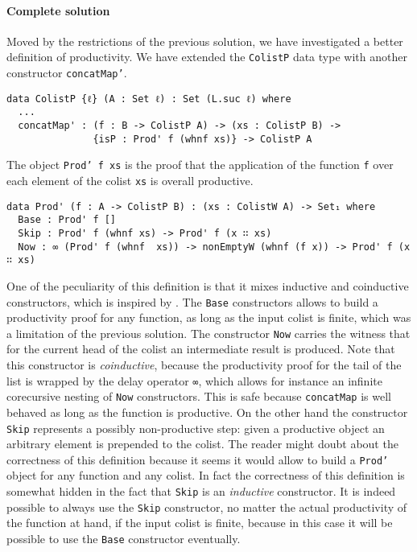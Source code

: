 \documentclass[10pt,a4paper]{article}
\begin{document}
\paragraph{Complete solution}
Moved by the restrictions of the previous solution, we have investigated a better definition of productivity.
We have extended the \texttt{ColistP} data type with another constructor \texttt{concatMap'}.
\begin{verbatim}
data ColistP {ℓ} (A : Set ℓ) : Set (L.suc ℓ) where
  ...
  concatMap' : (f : B -> ColistP A) -> (xs : ColistP B) -> 
               {isP : Prod' f (whnf xs)} -> ColistP A
\end{verbatim}
The object \texttt{Prod' f xs} is the proof that the application of the function \texttt{f} over each element of the colist \texttt{xs} is overall productive.
\begin{verbatim}
data Prod' (f : A -> ColistP B) : (xs : ColistW A) -> Set₁ where
  Base : Prod' f []
  Skip : Prod' f (whnf xs) -> Prod' f (x ∷ xs)
  Now : ∞ (Prod' f (whnf  xs)) -> nonEmptyW (whnf (f x)) -> Prod' f (x ∷ xs)
\end{verbatim}
One of the peculiarity of this definition is that it mixes inductive and coinductive constructors, which is inspired by \cite{DAN09}.
The \texttt{Base} constructors allows to build a productivity proof for any
function, as long as the input colist is finite, which was a limitation of the previous solution.
The constructor \texttt{Now} carries the witness that for the current head of the colist an intermediate result is produced. Note that this constructor is \emph{coinductive}, because the productivity proof for the tail of the list is wrapped by the delay operator \texttt{∞}, which allows for instance an infinite corecursive nesting of \texttt{Now} constructors. This is safe because \texttt{concatMap} is well behaved as long as the function is productive.
On the other hand the constructor \texttt{Skip} represents a possibly non-productive step: given a productive object an arbitrary element is prepended to the colist. The reader might doubt about the correctness of this definition because it seems it would allow to build a \texttt{Prod'} object for any function and any colist.
In fact the correctness of this definition is somewhat hidden in the fact that \texttt{Skip} is an \emph{inductive} constructor. 
It is indeed possible to always use the \texttt{Skip} constructor, no matter the actual productivity of the function at hand, if the input colist is finite, because in this case it will be possible to use the \texttt{Base} constructor eventually.
\end{document}
